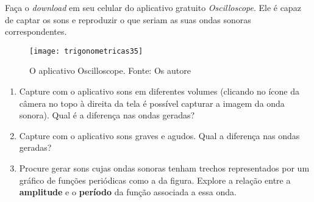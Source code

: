\begin{knowledge}
Faça o \textit{download} em seu celular do aplicativo gratuito \textit{Oscilloscope}. Ele é capaz de captar os sons e reproduzir o que seriam as suas ondas sonoras correspondentes.

\begin{figure}[H]
\centering

\texttt{[image: trigonometricas35]}
\caption{O aplicativo Oscilloscope. Fonte: Os autore}
\label{}
\end{figure}

\begin{enumerate}
\item Capture com o aplicativo sons em diferentes volumes (clicando no ícone da câmera no topo à direita da tela é possível capturar a imagem da onda sonora). Qual é a diferença nas ondas geradas?
\item Capture com o aplicativo sons graves e agudos. Qual a diferença nas ondas geradas?
\item Procure gerar sons cujas ondas sonoras tenham trechos representados por um gráfico de funções periódicas como a da figura. Explore a relação entre a \textbf{amplitude} e o \textbf{período} da função associada a essa onda.

\end{enumerate}

\end{knowledge}




